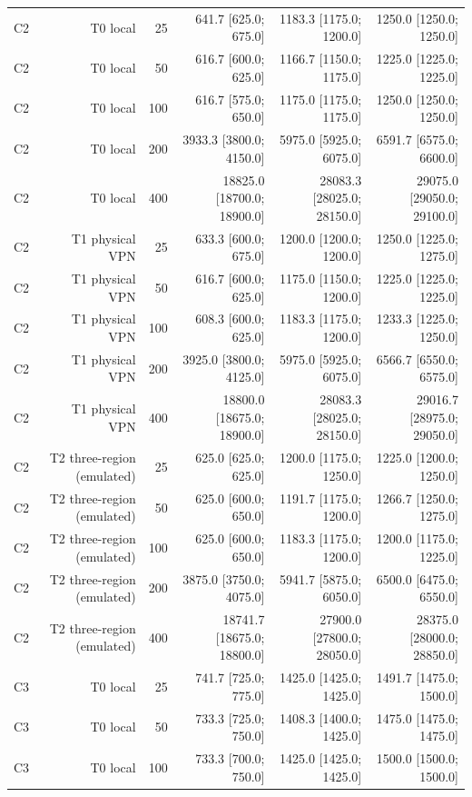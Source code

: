 \begin{table}[t]
\begin{tabular}{lrrrrr}
C2 & T0 local & 25 & 641.7 [625.0; 675.0] & 1183.3 [1175.0; 1200.0] & 1250.0 [1250.0; 1250.0] \\
C2 & T0 local & 50 & 616.7 [600.0; 625.0] & 1166.7 [1150.0; 1175.0] & 1225.0 [1225.0; 1225.0] \\
C2 & T0 local & 100 & 616.7 [575.0; 650.0] & 1175.0 [1175.0; 1175.0] & 1250.0 [1250.0; 1250.0] \\
C2 & T0 local & 200 & 3933.3 [3800.0; 4150.0] & 5975.0 [5925.0; 6075.0] & 6591.7 [6575.0; 6600.0] \\
C2 & T0 local & 400 & 18825.0 [18700.0; 18900.0] & 28083.3 [28025.0; 28150.0] & 29075.0 [29050.0; 29100.0] \\
C2 & T1 physical VPN & 25 & 633.3 [600.0; 675.0] & 1200.0 [1200.0; 1200.0] & 1250.0 [1225.0; 1275.0] \\
C2 & T1 physical VPN & 50 & 616.7 [600.0; 625.0] & 1175.0 [1150.0; 1200.0] & 1225.0 [1225.0; 1225.0] \\
C2 & T1 physical VPN & 100 & 608.3 [600.0; 625.0] & 1183.3 [1175.0; 1200.0] & 1233.3 [1225.0; 1250.0] \\
C2 & T1 physical VPN & 200 & 3925.0 [3800.0; 4125.0] & 5975.0 [5925.0; 6075.0] & 6566.7 [6550.0; 6575.0] \\
C2 & T1 physical VPN & 400 & 18800.0 [18675.0; 18900.0] & 28083.3 [28025.0; 28150.0] & 29016.7 [28975.0; 29050.0] \\
C2 & T2 three-region (emulated) & 25 & 625.0 [625.0; 625.0] & 1200.0 [1175.0; 1250.0] & 1225.0 [1200.0; 1250.0] \\
C2 & T2 three-region (emulated) & 50 & 625.0 [600.0; 650.0] & 1191.7 [1175.0; 1200.0] & 1266.7 [1250.0; 1275.0] \\
C2 & T2 three-region (emulated) & 100 & 625.0 [600.0; 650.0] & 1183.3 [1175.0; 1200.0] & 1200.0 [1175.0; 1225.0] \\
C2 & T2 three-region (emulated) & 200 & 3875.0 [3750.0; 4075.0] & 5941.7 [5875.0; 6050.0] & 6500.0 [6475.0; 6550.0] \\
C2 & T2 three-region (emulated) & 400 & 18741.7 [18675.0; 18800.0] & 27900.0 [27800.0; 28050.0] & 28375.0 [28000.0; 28850.0] \\
C3 & T0 local & 25 & 741.7 [725.0; 775.0] & 1425.0 [1425.0; 1425.0] & 1491.7 [1475.0; 1500.0] \\
C3 & T0 local & 50 & 733.3 [725.0; 750.0] & 1408.3 [1400.0; 1425.0] & 1475.0 [1475.0; 1475.0] \\
C3 & T0 local & 100 & 733.3 [700.0; 750.0] & 1425.0 [1425.0; 1425.0] & 1500.0 [1500.0; 1500.0] \\

\end{tabular}
\end{table}
